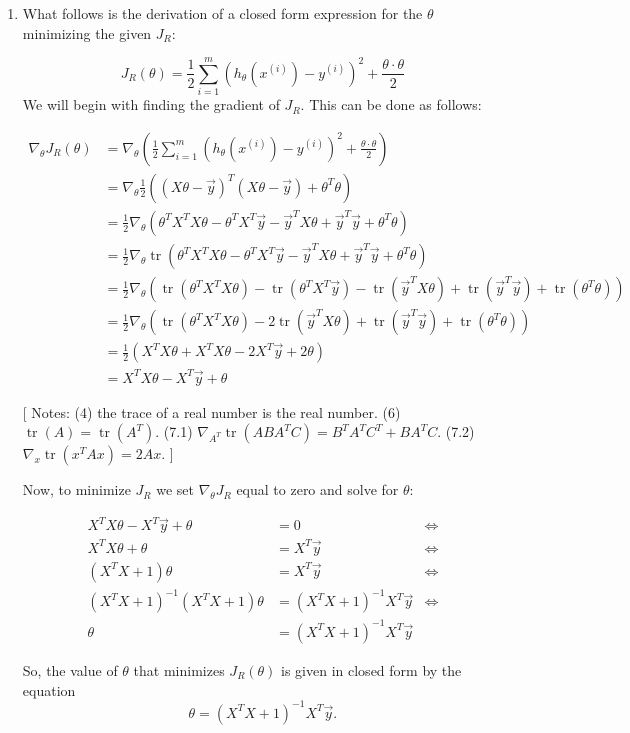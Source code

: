 \documentclass[12pt]{article}
\DeclareMathOperator{\Tr}{tr}
\begin{document}
\begin{enumerate}
   \item What follows is the derivation of a closed form expression for the  $\theta$ minimizing the given $J_R$:
   
   \[
   J_R(\theta) = \frac{1}{2} \sum_{i=1}^{m} \left( h_\theta (x^{(i)}) - y^{(i)} \right)^2 + \frac{\theta \cdot \theta}{2} 
   \]
   We will begin with finding the gradient of $J_R$. This can be done as follows:
   
   \begin{align}
   \nabla_\theta J_R(\theta) &= \nabla_\theta \left( \frac{1}{2} \sum_{i=1}^{m} \left( h_\theta (x^{(i)}) - y^{(i)} \right)^2 + \frac{\theta \cdot \theta}{2} \right)   \\
   &= \nabla_\theta \frac{1}{2} \left((X\theta - \vec{y})^T(X\theta - \vec{y}) + \theta^T \theta \right) \\
   &= \frac{1}{2} \nabla_\theta \left( \theta^TX^TX\theta - \theta^TX^T\vec{y} - \vec{y}^TX\theta + \vec{y}^T\vec{y} + \theta^T\theta \right) \\
   &= \frac{1}{2} \nabla_\theta \Tr \left( \theta^TX^TX\theta - \theta^TX^T\vec{y} - \vec{y}^TX\theta + \vec{y}^T\vec{y} + \theta^T\theta \right) \\
   &= \frac{1}{2} \nabla_\theta \left( \Tr(\theta^TX^TX\theta) - \Tr( \theta^TX^T\vec{y}) - \Tr(\vec{y}^TX\theta) + \Tr(\vec{y}^T\vec{y}) + \Tr(\theta^T\theta) \right) \\
   &= \frac{1}{2} \nabla_\theta \left( \Tr(\theta^TX^TX\theta) - 2\Tr(\vec{y}^TX\theta) + \Tr(\vec{y}^T\vec{y}) + \Tr(\theta^T\theta) \right) \\
   &= \frac{1}{2} \left( X^TX\theta + X^TX\theta - 2X^T\vec{y} + 2\theta \right)  \\
   &= X^TX\theta - X^T\vec{y} + \theta
   \end{align}
   
  \small [ Notes: (4) the trace of a real number is the real number. (6) $\Tr(A) = \Tr(A^T)$. (7.1) $\nabla_{A^T} \Tr (ABA^TC) = B^TA^TC^T + BA^TC$. (7.2) $\nabla_x\Tr(x^TAx) = 2Ax.$
  ]
  
  Now, to minimize $J_R$ we set $\nabla_\theta J_R$ equal to zero and solve for $\theta$:
  
  \begin{align*}
  X^TX\theta - X^T\vec{y} + \theta &= 0 &\Longleftrightarrow \\
  X^TX\theta + \theta &=  X^T\vec{y} &\Longleftrightarrow \\
  (X^TX + 1)\theta &=  X^T\vec{y} &\Longleftrightarrow \\
  (X^TX + 1)^{-1}(X^TX + 1)\theta &=  (X^TX + 1)^{-1}X^T\vec{y} &\Longleftrightarrow \\
  \theta &=  (X^TX + 1)^{-1}X^T\vec{y} & 
  \end{align*}
  
  So, the value of $\theta$ that minimizes $J_R(\theta)$ is given in closed form by the equation \[\theta =  (X^TX + 1)^{-1}X^T\vec{y}.\]
\end{enumerate}
\end{document}
